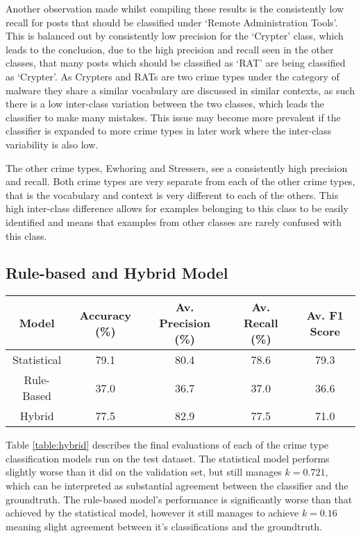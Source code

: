 \documentclass[12pt,a4paper,twoside,openright]{report}
\begin{document}
Another observation made whilst compiling these results is the consistently low recall for posts that should be classified under `Remote Administration Tools'. This is balanced out by consistently low precision for the `Crypter' class, which leads to the conclusion, due to the high precision and recall seen in the other classes, that many posts which should be classified as `RAT' are being classified as `Crypter'. As Crypters and RATs are two crime types under the category of malware they share a similar vocabulary are discussed in similar contexts, as such there is a low inter-class variation between the two classes, which leads the classifier to make many mistakes. This issue may become more prevalent if the classifier is expanded to more crime types in later work where the inter-class variability is also low.

The other crime types, Ewhoring and Stressers, see a consistently high precision and recall. Both crime types are very separate from each of the other crime types, that is the vocabulary and context is very different to each of the others. This high inter-class difference allows for examples belonging to this class to be easily identified and means that examples from other classes are rarely confused with this class.


\subsection{Rule-based and Hybrid Model}

\begin{table*}[h]
\centering
\begin{tabular}{|c|c|c|c|c|}
\hline
Model & Accuracy (\%) & Av. Precision (\%) & Av. Recall (\%) & Av. F1 Score\\ \hline \hline
Statistical & 79.1 & 80.4 & 78.6 & 79.3 \\ \hline
Rule-Based & 37.0 & 36.7 & 37.0 & 36.6 \\ \hline
Hybrid & 77.5 & 82.9 & 77.5 & 71.0 \\ \hline
\end{tabular}
\caption{Average metrics across the crime types for each classifier on the test dataset} \label{table:hybrid}
\end{table*}
Table \ref{table:hybrid} describes the final evaluations of each of the crime type classification models run on the test dataset. The statistical model performs slightly worse than it did on the validation set, but still manages $k=0.721$, which can be interpreted \cite{landis1977measurement} as substantial agreement between the classifier and the groundtruth. The rule-based model's performance is significantly worse than that achieved by the statistical model, however it still manages to achieve $k=0.16$ meaning slight agreement between it's classifications and the groundtruth.
\newline  
\end{document}
